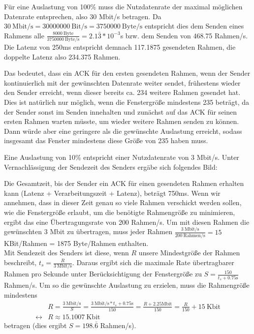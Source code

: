 \documentclass{../exercisesheet}
\begin{document}
\begin{exercise}{2.5}
\begin{subexercise}
Für eine Auslastung von 100\% muss die Nutzdatenrate der maximal möglichen Datenrate entsprechen, also 30 Mbit/s betragen. Da $30\ \text{Mbit/s} = 30000000\ \text{Bit/s} = 3750000\ \text{Byte/s}$ entspricht dies dem Senden eines Rahmens alle $\frac{8000\ \text{Byte}}{3750000\ \text{Byte/s}} = 2.1\bar{3} * 10^{-3}$s bzw. dem Senden von 468.75 Rahmen/s. Die Latenz von 250ms entspricht demnach 117.1875 gesendeten Rahmen, die doppelte Latenz also 234.375 Rahmen.

Das bedeutet, dass ein ACK für den ersten gesendeten Rahmen, wenn der Sender kontinuierlich mit der gewünschten Datenrate weiter sendet, frühestens wieder den Sender erreicht, wenn dieser bereits ca. 234 weitere Rahmen gesendet hat. Dies ist natürlich nur möglich, wenn die Fenstergröße mindestens 235 beträgt, da der Sender sonst im Senden innehalten und zunächst auf das ACK für seinen ersten Rahmen warten müsste, um wieder weitere Rahmen senden zu können. Dann würde aber eine geringere als die gewünschte Auslastung erreicht, sodass insgesamt das Fenster mindestens diese Größe von 235 haben muss.
\end{subexercise}
\begin{subexercise}
	Eine Auslastung von 10\% entspricht einer Nutzdatenrate von 3 Mbit/s. Unter Vernachlässigung der Sendezeit des Senders ergäbe sich folgendes Bild:
	
	Die Gesamtzeit, bis der Sender ein ACK für einen gesendeten Rahmen erhalten kann (Latenz + Verarbeitungszeit + Latenz), beträgt 750ms. Wenn wir annehmen, dass in dieser Zeit genau so viele Rahmen verschickt werden sollen, wie die Fenstergröße erlaubt, um die benötigte Rahmengröße zu minimieren, ergibt das eine Übertragungsrate von 200 Rahmen/s. Um mit diesen Rahmen die gewünschten 3 Mbit zu übertragen, muss jeder Rahmen $\frac{3\ \text{Mbit/s}}{200\ \text{Rahmen/s}} = 15$ KBit/Rahmen = 1875 Byte/Rahmen enthalten.
	\\
	
	Mit Sendezeit des Senders ist diese, wenn $R$ unsere Mindestgröße der Rahmen beschreibt, $t_s = \frac{R}{3\ \text{Mbit/s}}$. Daraus ergibt sich die maximale Rate übertragbarer Rahmen pro Sekunde unter Berücksichtigung der Fenstergröße zu $S = \frac{150}{t_s + 0.75 \text{s}}$ Rahmen/s. Um so die gewünschte Auslastung zu erzielen, muss die Rahmengröße mindestens
	\begin{equation*}
	\begin{split}
	&R = \frac{3\ \text{Mbit/s}}{S} = \frac{3\ \text{Mbit/s} * t_s + 0.75 \text{s}}{150} = \frac{R + 2.25 \text{Mbit}}{150} = \frac{R}{150} + 15\ \text{Kbit} \\
	\leftrightarrow &R \approx 15.1007\ \text{Kbit}
	\end{split}
	\end{equation*}
betragen (dies ergibt $S = 198.\bar{6}$ Rahmen/s).
\end{subexercise}
\end{exercise}
\end{document}
